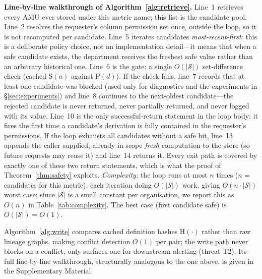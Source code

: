 \documentclass[nolineno]{ieeeaccess}
\begin{document}
\textbf{Line-by-line walkthrough of Algorithm~\ref{alg:retrieve}.}
Line~1 retrieves every AMU ever stored under this metric name; this list is
the candidate pool. Line~2 resolves the requester's column permission set
once, outside the loop, so it is not recomputed per candidate. Line~5
iterates candidates \emph{most-recent-first}: this is a deliberate policy
choice, not an implementation detail---it means that when a safe candidate
exists, the department receives the freshest safe value rather than an
arbitrary historical one. Line~6 is the gate: a single $O(|\mathcal{S}|)$
set-difference check (cached $\mathrm{S}(a)$ against $\mathrm{P}(d)$). If the
check fails, line~7 records that at least one candidate was blocked (used
only for diagnostics and the experiments in \S\ref{sec:experiments}) and
line~8 continues to the next-oldest candidate---the rejected candidate is
never returned, never partially returned, and never logged with its value.
Line~10 is the only successful-return statement in the loop body: it fires
the first time a candidate's derivation is fully contained in the
requester's permissions. If the loop exhausts all candidates without a safe
hit, line~13 appends the caller-supplied, already-in-scope \textit{fresh}
computation to the store (so future requests may reuse it) and line~14
returns it. Every exit path is covered by exactly one of these two return
statements, which is what the proof of Theorem~\ref{thm:safety} exploits.
\emph{Complexity:} the loop runs at most $n$ times ($n$ = candidates for
this metric), each iteration doing $O(|\mathcal{S}|)$ work, giving
$O(n\cdot|\mathcal{S}|)$ worst case; since $|\mathcal{S}|$ is a small
constant per organisation, we report this as $O(n)$ in
Table~\ref{tab:complexity}. The best case (first candidate safe) is
$O(|\mathcal{S}|) = O(1)$.

Algorithm~\ref{alg:write} compares cached definition hashes $\mathrm{H}(\cdot)$
rather than raw lineage graphs, making conflict detection $O(1)$ per pair; the
write path never blocks on a conflict, only surfaces one for downstream
alerting (threat T2). Its full line-by-line walkthrough, structurally
analogous to the one above, is given in the Supplementary Material.
\end{document}
